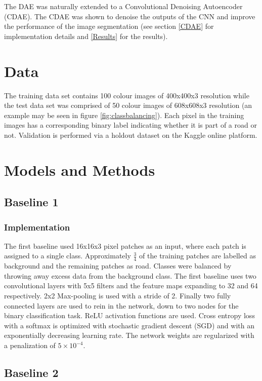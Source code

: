 \documentclass[10pt,conference,compsocconf]{IEEEtran}
\begin{document}
The DAE was naturally extended to a Convolutional Denoising Autoencoder (CDAE). The CDAE was shown to denoise the outputs of the CNN and improve the performance of the image segmentation (see section \ref{CDAE} for implementation details and \ref{Results} for the results).

\section{Data}

The training data set contains 100 colour images of 400x400x3 resolution while the test data set was comprised of 50 colour images of 608x608x3 resolution (an example may be seen in figure \ref{fig:classbalancing}). Each pixel in the training images has a corresponding binary label indicating whether it is part of a road or not. Validation is performed via a holdout dataset on the Kaggle online platform.

\section{Models and Methods}
\label{MM}

\subsection{Baseline 1}
\label{Baseline1}

\subsubsection{Implementation}
The first baseline used 16x16x3 pixel patches as an input, where each patch is assigned to a single class. Approximately $\frac{3}{4}$ of the training patches are labelled as background and the remaining patches as road. Classes were balanced by throwing away excess data from the background class. The first baseline uses two convolutional layers with 5x5 filters and the feature maps expanding to 32 and 64 respectively. 2x2 Max-pooling is used with a stride of 2. Finally two fully connected layers are used to rein in the network, down to two nodes for the binary classification task. ReLU activation functions are used. Cross entropy loss with a softmax is optimized with stochastic gradient descent (SGD) and with an exponentially decreasing learning rate. The network weights are regularized with a penalization of $5\times10^{-4}$.

\subsection{Baseline 2}
\label{Baseline2}
\end{document}
